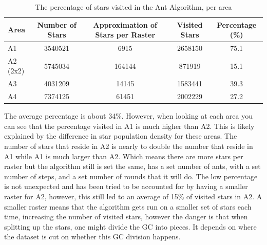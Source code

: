 
\begin{table}[H]
    \centering
    \begin{tabular}{l c c c c}
        \toprule
        Area     & Number of Stars & Approximation of Stars per Raster & Visited Stars & Percentage (\%) \\
        \midrule
        A1       & \num{3540521}   & \num{6915}                        & \num{2658150} & 75.1            \\
        A2 (2x2) & \num{5745034}   & \num{164144}                      & \num{871919}  & 15.1            \\
        A3       & \num{4031209}   & \num{14145}                       & \num{1583441} & 39.3            \\
        A4       & \num{7374125}   & \num{61451}                       & \num{2002229} & 27.2            \\
        \bottomrule
    \end{tabular}
    \caption{The percentage of stars visited in the Ant Algorithm, per area}
    \label{tb:visited-stars-percentage}
\end{table}

The average percentage is about 34\%. However, when looking at each area you can see that the percentage visited in A1 is much higher than A2. This is likely explained by the difference in star population density for these areas. The number of stars that reside in A2 is nearly to double the number that reside in A1 while A1 is much larger than A2. Which means there are more stars per raster but the algorithm still is set the same, has a set number of ants, with a set number of steps, and a set number of rounds that it will do. The low percentage is not unexpected and has been tried to be accounted for by having a smaller raster for A2, however, this still led to an average of 15\% of visited stars in A2. A smaller raster means that the algorithm gets run on a smaller set of stars each time, increasing the number of visited stars, however the danger is that when splitting up the stars, one might divide the GC into pieces. It depends on where the dataset is cut on whether this GC division happens.


